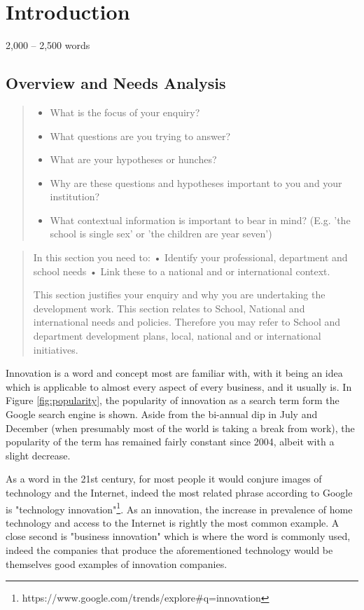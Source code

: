 \section{Introduction}
2,000 – 2,500 words\citep{Frame61:online}

\subsection{Overview and Needs Analysis}
\begin{quote}
\begin{itemize}

\item  What is the focus of your enquiry?
\item What questions are you trying to answer?
\item What are your hypotheses or hunches?
\item Why are these questions and hypotheses important to you and your institution?
\item What contextual information is important to bear in mind? (E.g. 'the school is single sex' or 'the children are year seven')

\end{itemize}
\end{quote}

\begin{quote}
In this section you need to:
•	Identify your professional, department and school needs
•	Link these to a national and or international context.

This section justifies your enquiry and why you are undertaking the development work. This section relates to School, National and international needs and policies. Therefore you may refer to School and department development plans, local, national and or international initiatives.
\end{quote}

Innovation is a word and concept most are familiar with, with it being an idea which is applicable to almost every aspect of every business, and it usually is. In Figure \ref{fig:popularity}, the popularity of innovation as a search term form the Google search engine is shown. Aside from the bi-annual dip in July and December (when presumably most of the world is taking a break from work), the popularity of the term has remained fairly constant since 2004, albeit with a slight decrease.

As a word in the 21st century, for most people it would conjure images of technology and the Internet, indeed the most related phrase according to Google is "technology innovation"\footnote{https://www.google.com/trends/explore#q=innovation}. As an innovation, the increase in prevalence of home technology and access to the Internet is rightly the most common example. A close second is "business innovation" which is where the word is commonly used, indeed the companies that produce the aforementioned technology would be themselves good examples of innovation companies.

